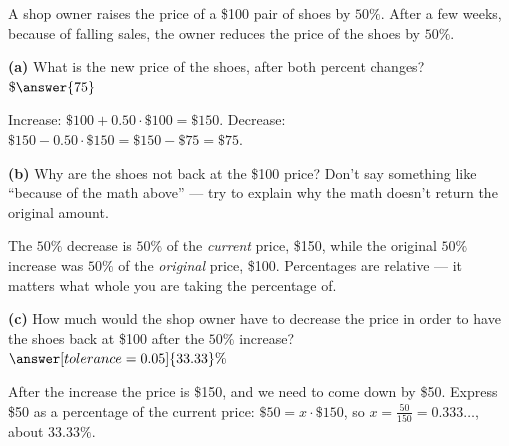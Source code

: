 \documentclass[12pt]{ximera}
\begin{document}
\begin{problem}
A shop owner raises the price of a \$100 pair of shoes by $50\%$. After a few weeks,
because of falling sales, the owner reduces the price of the shoes by $50\%$.

\begin{prompt}
\textbf{(a)} What is the new price of the shoes, after both percent changes?
$\$\answer{75}$

\begin{solution}
Increase: $\$100 + 0.50 \cdot \$100 = \$150$.
Decrease: $\$150 - 0.50 \cdot \$150 = \$150 - \$75 = \$75$.
\end{solution}
\end{prompt}

\begin{prompt}
\textbf{(b)} Why are the shoes not back at the \$100 price? Don't say something like
``because of the math above'' --- try to explain why the math doesn't return the
original amount.
\begin{freeResponse}
\end{freeResponse}

\begin{solution}
The $50\%$ decrease is $50\%$ of the \emph{current} price, \$150, while the original
$50\%$ increase was $50\%$ of the \emph{original} price, \$100. Percentages are
relative --- it matters what whole you are taking the percentage of.
\end{solution}
\end{prompt}

\begin{prompt}
\textbf{(c)} How much would the shop owner have to decrease the price in order to
have the shoes back at \$100 after the $50\%$ increase?
$\answer[tolerance=0.05]{33.33}\%$

\begin{solution}
After the increase the price is \$150, and we need to come down by \$50. Express \$50
as a percentage of the current price: $\$50 = x \cdot \$150$, so
$x = \frac{50}{150} = 0.333\ldots$, about $33.33\%$.
\end{solution}
\end{prompt}
\end{problem}
\end{document}
